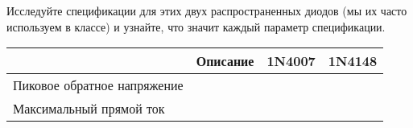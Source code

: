 
Исследуйте спецификации для этих двух распространенных диодов (мы их часто
используем в классе) и узнайте, что значит каждый параметр спецификации.

\begin{tabular}{|l|p{}|p{}|p{}|}
\hline
& Описание & 1N4007 & 1N4148 \\
\hline
Пиковое обратное напряжение&&&\\
\hline
Максимальный прямой ток&&&\\
\hline
\end{tabular}
